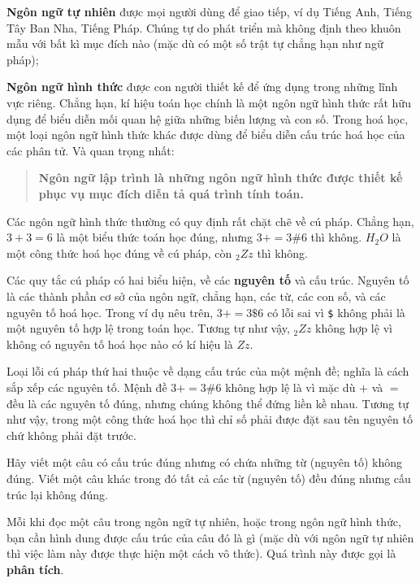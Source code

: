 \documentclass[11pt]{book}
\begin{document}
{\bf Ngôn ngữ tự nhiên} được mọi người dùng để giao tiếp,
ví dụ Tiếng Anh, Tiếng Tây Ban Nha, Tiếng Pháp. Chúng
tự do phát triển mà 
không định theo khuôn mẫu với bất kì mục đích nào (mặc dù 
có một số trật tự chẳng hạn như ngữ pháp); 

{\bf Ngôn ngữ hình thức} được con người thiết kế để ứng dụng trong những
lĩnh vực riêng. Chẳng hạn, kí hiệu toán học chính là một ngôn ngữ 
hình thức rất hữu dụng để biểu diễn mối quan hệ giữa những biến lượng
và con số. Trong hoá học, một loại ngôn ngữ hình thức khác được dùng
để biểu diễn cấu trúc hoá học của các phân tử. Và quan trọng nhất:

\begin{quote}
\textbf{Ngôn ngữ lập trình là những ngôn ngữ hình thức được thiết kế phục vụ
mục đích diễn tả quá trình tính toán.}
\end{quote}

Các ngôn ngữ hình thức thường có quy định rất chặt chẽ về cú pháp.
Chẳng hạn, $3 + 3 = 6$ là một biểu thức toán học đúng, nhưng
$3 + = 3 \mbox{\#} 6$ thì không.  $H_2O$ là một công thức hoá học
đúng về cú pháp, còn $_2Zz$ thì không.

Các quy tắc cú pháp có hai biểu hiện, về các {\bf nguyên tố} và 
cấu trúc. Nguyên tố là các thành phần cơ sở của ngôn ngữ, chẳng hạn,
các từ, các con số, và các nguyên tố hoá học. Trong ví dụ nêu trên, $3 +
= 3 \mbox{\$} 6$ có lỗi sai vì \verb"$" không phải là một nguyên tố
hợp lệ trong toán học. Tương tự như vậy, $_2Zz$ không hợp lệ vì 
không có nguyên tố hoá học nào có kí hiệu là $Zz$.


Loại lỗi cú pháp thứ hai thuộc về dạng cấu trúc của một mệnh đề;
nghĩa là cách sắp xếp các nguyên tố. Mệnh đề  $3
+ = 3 \mbox{\#} 6$ không hợp lệ là vì mặc dù  $+$ và $=$ đều
là các nguyên tố đúng, nhưng chúng không thể đứng liền kề nhau.
Tương tự như vậy, trong một công thức hoá học thì chỉ số phải
được đặt sau tên nguyên tố chứ không phải đặt trước.

\begin{ex}
Hãy viết một câu có cấu trúc đúng nhưng có chứa những từ (nguyên tố)
không đúng. Viết một câu khác trong đó tất cả các từ (nguyên tố) đều đúng
nhưng cấu trúc lại không đúng.
\end{ex}

Mỗi khi đọc một câu trong ngôn ngữ tự nhiên, hoặc trong ngôn ngữ
hình thức, bạn cần hình dung được cấu trúc của câu đó là gì (mặc dù
với ngôn ngữ tự nhiên thì việc làm này được thực hiện một cách vô thức).
Quá trình này được gọi là \textbf{phân tích}.
\end{document}
